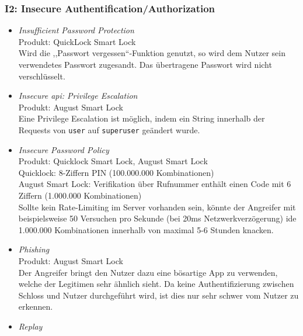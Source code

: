     \subsubsection*{I2: Insecure Authentification/Authorization}
        \begin{itemize}[leftmargin=0cm,label={}]
            \item \emph{Insufficient Password Protection}\cite{Ye2017}\label{vuln:pwdprot}\\
    	        Produkt: QuickLock Smart Lock\\ 
                Wird die ,,Passwort vergessen``-Funktion genutzt, so wird dem Nutzer sein verwendetes Passwort zugesandt. 
                Das übertragene Passwort wird nicht verschlüsselt.
            \item \emph{Insecure \gls{api}: Privilege Escalation}\cite{Fuller2017,Lariviere2015}\label{vuln:privesc}\\
                Produkt: August Smart Lock\\
                Eine Privilege Escalation ist möglich, indem ein String innerhalb der Requests von \colorbox{light-gray}{\lstinline{user}} auf \colorbox{light-gray}{\lstinline{superuser}} geändert wurde.
            \item \emph{Insecure Password Policy}\cite{Rose2016,Ye2017,Jmaxxz2015a}\label{vuln:pwdpol}\\
                Produkt: Quicklock Smart Lock, August Smart Lock\\
                Quicklock: 8-Ziffern PIN (100.000.000 Kombinationen)\\
                August Smart Lock: Verifikation über Rufnummer enthält einen Code mit 6 Ziffern (1.000.000 Kombinationen)\\
                Sollte kein Rate-Limiting im Server vorhanden sein, könnte der Angreifer mit beispielsweise 50 Versuchen pro Sekunde (bei 20ms Netzwerkverzögerung) ide 1.000.000 Kombinationen innerhalb von maximal 5-6 Stunden knacken.
            \item \emph{Phishing}\cite{Ye2017}\label{vuln:phishing}\\
    	        Produkt: August Smart Lock\\ 
                Der Angreifer bringt den Nutzer dazu eine bösartige App zu verwenden, welche der Legitimen sehr ähnlich sieht. 
                Da keine Authentifizierung zwischen Schloss und Nutzer durchgeführt wird, ist dies nur sehr schwer vom Nutzer zu erkennen.
            \item \emph{Replay}\cite{Tierney2018,Rose2016,Ho2016}\label{vuln:replay}\\

\end{itemize}
